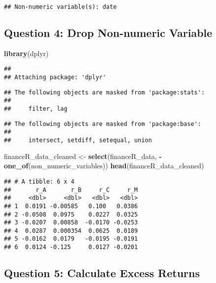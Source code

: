 \documentclass[
]{article}
\newenvironment{Shaded}{\begin{snugshade}}{\end{snugshade}}
\newcommand{\FunctionTok}[1]{\textcolor[rgb]{0.13,0.29,0.53}{\textbf{#1}}}
\newcommand{\NormalTok}[1]{#1}
\newcommand{\OtherTok}[1]{\textcolor[rgb]{0.56,0.35,0.01}{#1}}
\newcommand{\SpecialCharTok}[1]{\textcolor[rgb]{0.81,0.36,0.00}{\textbf{#1}}}
\begin{document}
\begin{verbatim}
## Non-numeric variable(s): date
\end{verbatim}

\hypertarget{question-4-drop-non-numeric-variable}{%
\subsection{Question 4: Drop Non-numeric
Variable}\label{question-4-drop-non-numeric-variable}}

\begin{Shaded}
\begin{Highlighting}[]
\FunctionTok{library}\NormalTok{(dplyr)}
\end{Highlighting}
\end{Shaded}

\begin{verbatim}
## 
## Attaching package: 'dplyr'
\end{verbatim}

\begin{verbatim}
## The following objects are masked from 'package:stats':
## 
##     filter, lag
\end{verbatim}

\begin{verbatim}
## The following objects are masked from 'package:base':
## 
##     intersect, setdiff, setequal, union
\end{verbatim}

\begin{Shaded}
\begin{Highlighting}[]
\NormalTok{financeR\_data\_cleaned }\OtherTok{\textless{}{-}} \FunctionTok{select}\NormalTok{(financeR\_data, }\SpecialCharTok{{-}}\FunctionTok{one\_of}\NormalTok{(non\_numeric\_variables))}
\FunctionTok{head}\NormalTok{(financeR\_data\_cleaned)}
\end{Highlighting}
\end{Shaded}

\begin{verbatim}
## # A tibble: 6 x 4
##       r_A       r_B     r_C     r_M
##     <dbl>     <dbl>   <dbl>   <dbl>
## 1  0.0191 -0.00585   0.100   0.0386
## 2 -0.0508  0.0975    0.0227  0.0325
## 3 -0.0207  0.00858  -0.0170 -0.0253
## 4  0.0287  0.000354  0.0625  0.0189
## 5 -0.0162  0.0179   -0.0195 -0.0191
## 6  0.0124 -0.125     0.0127 -0.0201
\end{verbatim}

\hypertarget{question-5-calculate-excess-returns}{%
\subsection{Question 5: Calculate Excess
Returns}\label{question-5-calculate-excess-returns}}
\end{document}
